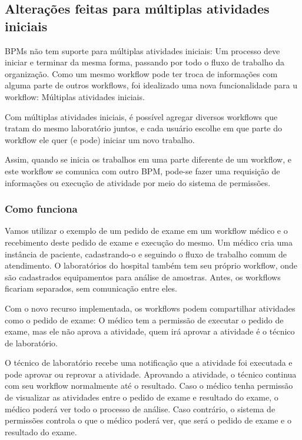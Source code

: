 \subsection{Alterações feitas para múltiplas atividades iniciais}

BPMs não tem suporte para múltiplas atividades iniciais: Um processo deve iniciar e terminar da mesma forma, passando por todo o fluxo de trabalho da organização. \R
Como um mesmo workflow pode ter troca de informações com alguma parte de outros workflows, foi idealizado uma nova funcionalidade para u workflow: Múltiplas atividades iniciais.

Com múltiplas atividades iniciais, é possível agregar diversos workflows que tratam do mesmo laboratório juntos, e cada usuário escolhe em que parte do workflow ele quer (e pode) iniciar um novo trabalho.

Assim, quando se inicia os trabalhos em uma parte diferente de um workflow, e este workflow se comunica com outro BPM, pode-se fazer uma requisição de informações ou execução de atividade por meio do sistema de permissões.

\subsubsection{Como funciona}

Vamos utilizar o exemplo de um pedido de exame em um workflow médico e o recebimento deste pedido de exame e execução do mesmo.
Um médico cria uma instância de paciente, cadastrando-o e seguindo o fluxo de trabalho comum de atendimento.
O laboratórios do hospital também tem seu próprio workflow, onde são cadastrados equipamentos para análise de amostras.
Antes, os workflows ficariam separados, sem comunicação entre eles.

Com o novo recurso implementada, os workflows podem compartilhar atividades como o pedido de exame: O médico tem a permissão de executar o pedido de exame, mas ele não aprova a atividade, quem irá aprovar a atividade é o técnico de laboratório.

O técnico de laboratório recebe uma notificação que a atividade foi executada e pode aprovar ou reprovar a atividade.
Aprovando a atividade, o técnico continua com seu workflow normalmente até o resultado.
Caso o médico tenha permissão de visualizar as atividades entre o pedido de exame e resultado do exame, o médico poderá ver todo o processo de análise.
Caso contrário, o sistema de permissões controla o que o médico poderá ver, que será o pedido de exame e o resultado do exame.

